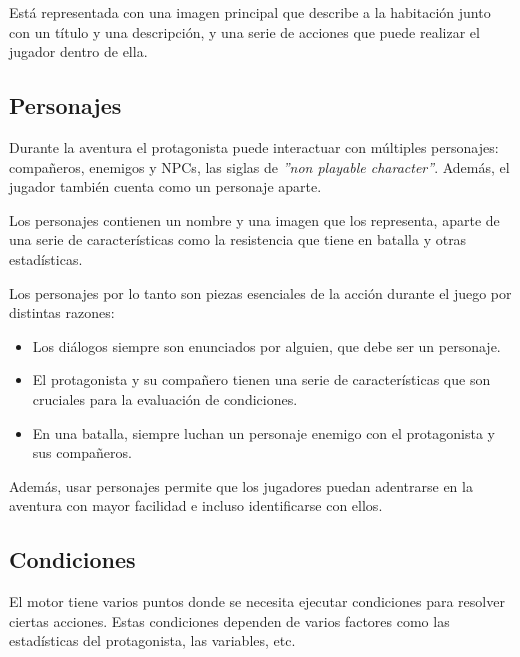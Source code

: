 Está representada con una imagen principal que describe a la habitación junto con un título y una descripción, y una serie de acciones que puede realizar el jugador dentro de ella.

\subsection{Personajes}
Durante la aventura el protagonista puede interactuar con múltiples personajes: compañeros, enemigos y NPCs, las siglas de \textit{''non playable character''}. \cite{npcGeekno} Además, el jugador también cuenta como un personaje aparte.

Los personajes contienen un nombre y una imagen que los representa, aparte de una serie de características como la resistencia que tiene en batalla y otras estadísticas.

Los personajes por lo tanto son piezas esenciales de la acción durante el juego por distintas razones:

\begin{itemize}
	\item Los diálogos siempre son enunciados por alguien, que debe ser un personaje.
	\item El protagonista y su compañero tienen una serie de características que son cruciales para la evaluación de condiciones.
	\item En una batalla, siempre luchan un personaje enemigo con el protagonista y sus compañeros.
\end{itemize}

Además, usar personajes permite que los jugadores puedan adentrarse en la aventura con mayor facilidad e incluso identificarse con ellos.

\subsection{Condiciones} \label{conditionsSubsection}
El motor tiene varios puntos donde se necesita ejecutar condiciones para resolver ciertas acciones. Estas condiciones dependen de varios factores como las estadísticas del protagonista, las variables, etc.

